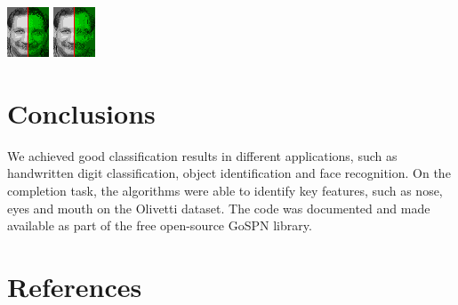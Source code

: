 \documentclass[10pt,a4paper]{article}
\newenvironment{Figure}
  {\par\smallskip\noindent\minipage{\linewidth}}
  {\endminipage\smallskip\par}
\begin{document}
\begin{multicols*}{2}
\begin{Figure}
  \centering\includegraphics[scale=8.0]{imgs/gens_cmpl.png}
  \includegraphics[scale=1.925]{imgs/dennis_cmpl.png}\\
  \vspace{-0.2cm}
\end{Figure}

\section*{Conclusions}

We achieved good classification results in different applications, such as handwritten digit
classification, object identification and face recognition. On the completion task, the algorithms
were able to identify key features, such as nose, eyes and mouth on the Olivetti dataset. The code
was documented and made available as part of the free open-source GoSPN library.


\smallskip
\section*{References}
\vspace{0.1cm}

\AtNextBibliography{\fontsize{10pt}{12.0}\selectfont}
\printbibliography[heading=none]

\end{multicols*}
\end{document}
